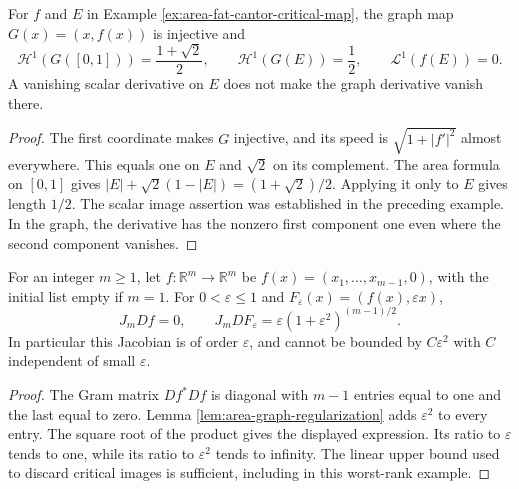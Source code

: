 \begin{example}\label{ex:area-fat-cantor-graph}
For $f$ and $E$ in Example \ref{ex:area-fat-cantor-critical-map}, the graph map $G(x)=(x,f(x))$ is injective and
\[
 \mathcal H^1(G([0,1]))=\frac{1+\sqrt2}{2},
 \qquad \mathcal H^1(G(E))=\frac12,
 \qquad \mathcal L^1(f(E))=0.
\]
A vanishing scalar derivative on $E$ does not make the graph derivative vanish there.
\end{example}
\begin{proof}
The first coordinate makes $G$ injective, and its speed is $\sqrt{1+|f'|^2}$ almost everywhere. This equals one on $E$ and $\sqrt2$ on its complement. The area formula on $[0,1]$ gives $|E|+\sqrt2(1-|E|)=(1+\sqrt2)/2$. Applying it only to $E$ gives length $1/2$. The scalar image assertion was established in the preceding example. In the graph, the derivative has the nonzero first component one even where the second component vanishes.
\end{proof}

\begin{example}\label{ex:area-linear-regularization-rate}
For an integer $m\geq1$, let $f:\mathbb R^m\to\mathbb R^m$ be $f(x)=(x_1,\ldots,x_{m-1},0)$, with the initial list empty if $m=1$. For $0<\varepsilon\leq1$ and $F_\varepsilon(x)=(f(x),\varepsilon x)$,
\[
 J_mDf=0,
 \qquad J_mDF_\varepsilon
 =\varepsilon(1+\varepsilon^2)^{(m-1)/2}.
\]
In particular this Jacobian is of order $\varepsilon$, and cannot be bounded by $C\varepsilon^2$ with $C$ independent of small $\varepsilon$.
\end{example}
\begin{proof}
The Gram matrix $Df^*Df$ is diagonal with $m-1$ entries equal to one and the last equal to zero. Lemma \ref{lem:area-graph-regularization} adds $\varepsilon^2$ to every entry. The square root of the product gives the displayed expression. Its ratio to $\varepsilon$ tends to one, while its ratio to $\varepsilon^2$ tends to infinity. The linear upper bound used to discard critical images is sufficient, including in this worst-rank example.
\end{proof}

